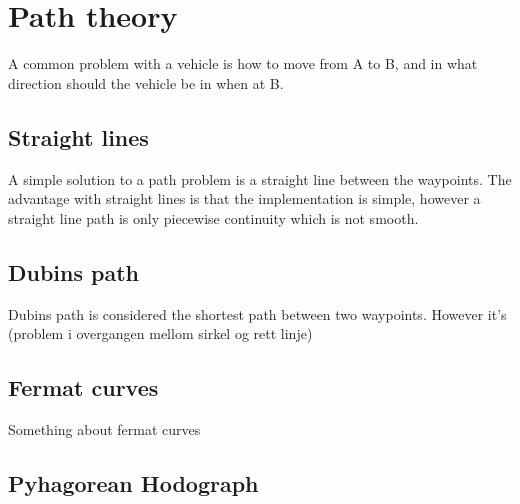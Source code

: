 \chapter{Path theory}
A common problem with a vehicle is how to move from A to B, and in what direction should the vehicle be in when at B. 

\section{Straight lines}
A simple solution to a path problem is a straight line between the waypoints. The advantage with straight lines is that the implementation is simple, however a straight line path is only piecewise continuity which is not smooth.
\section{Dubins path}
Dubins path is considered the shortest path between two waypoints. However it's (problem i overgangen mellom sirkel og rett linje)
\section{Fermat curves}
Something about fermat curves
\section{Pyhagorean Hodograph}